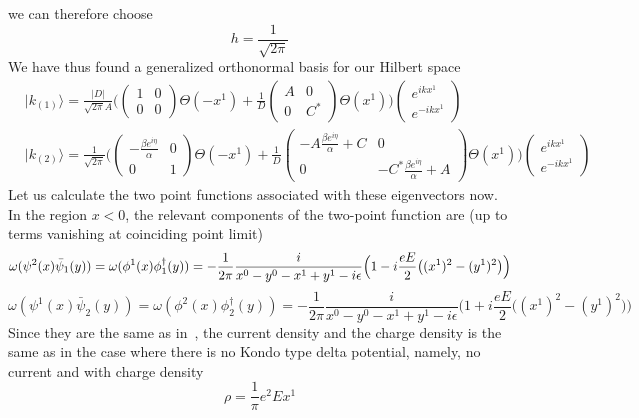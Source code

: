 we can therefore choose
\begin{equation*}
h = \frac{1}{\sqrt{2\pi}}
\end{equation*}
We have thus found a generalized orthonormal basis for our Hilbert space
\begin{equation}
\begin{split}
& | k_{(1)} \rangle = \frac{|D|}{\sqrt{2\pi}A}\bigg( \begin{pmatrix} 1 & 0 \\ 0 & 0 \end{pmatrix}
\Theta(-x^1) + 
\frac{1}{D}\begin{pmatrix} A & 0 \\  0 & C^* \end{pmatrix} \Theta(x^1) \bigg)
\begin{pmatrix} e^{ikx^1}  \\ e^{-ikx^1} \end{pmatrix}   \\
& | k_{(2)} \rangle = \frac{1}{\sqrt{2\pi}}
\Bigg( \begin{pmatrix} -\frac{\beta e^{i\eta}}{\alpha} & 0 \\ 0 & 1 \end{pmatrix}
\Theta(-x^1) + 
\frac{1}{D}\begin{pmatrix} -A\frac{\beta e^{i\eta}}{\alpha} + C  & 0\\ 0&  -C^*\frac{\beta e^{i\eta}}{\alpha} + A  \end{pmatrix} \Theta(x^1) \Bigg)
\begin{pmatrix} e^{ikx^1}  \\  e^{-ikx^1}  \end{pmatrix}  
\end{split}
\end{equation}
Let us calculate the two point functions associated with these eigenvectors now. In the region $x<0$, the relevant components of the two-point function are (up to terms vanishing at coinciding point limit)
\begin{equation*}
\omega(\psi^2(x)\bar{\psi}_1(y)) =  \omega(\phi^1(x)\phi^\dagger_1(y)) \\ = -\frac{1}{2\pi}\frac{i}{x^0 - y^0 - x^1 + y^1 - i\epsilon} \Big(1 -  i\frac{eE}{2}\big((x^1)^2 - (y^1)^2 \big) \Big) 
\end{equation*}
\begin{equation*}
\omega(\psi^1(x)\bar{\psi}_2(y))   =  \omega(\phi^2(x)\phi^\dagger_2(y)) = -\frac{1}{2\pi}\frac{i}{x^0 - y^0 - x^1 + y^1 - i\epsilon} \Big(1 + i\frac{eE}{2}\big((x^1)^2 - (y^1)^2 \big) \Big)
\end{equation*}
Since they are the same as in~\cite{Zahn2015}, the current density and the charge density is the same as in the case where there is no Kondo type delta potential, namely, no current and with charge density 
\begin{equation}\label{vacuum-charge_nbdy}
\rho = \frac{1}{\pi} e^2 E x^1
\end{equation}

